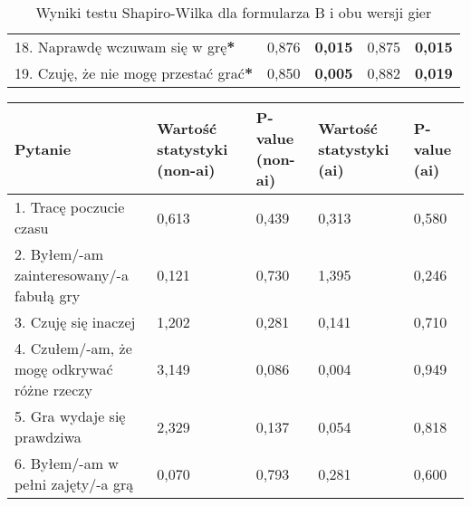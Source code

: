 \begin{table}[!h]
\begin{center}
\begin{tabular}{|m{10em}|m{5em}|m{5em}|m{5em}|m{5em}|}
            18. Naprawdę wczuwam się w grę\textbf{*}                                    & 0,876                             & \textbf{0,015}         & 0,875                         & \textbf{0,015}     \\
            19. Czuję, że nie mogę przestać grać\textbf{*}                              & 0,850                             & \textbf{0,005}         & 0,882                         & \textbf{0,019}     \\
            \hline
        \end{tabular}
    \end{center}
    \caption{Wyniki testu Shapiro-Wilka dla formularza B i obu wersji gier}\label{tab1:ch7_11}
\end{table}

\begin{table}[!h]
    \begin{center}
        \begin{tabular}{|m{10em}|m{5em}|m{5em}|m{5em}|m{5em}|}
            \hline
            Pytanie                                                           & Wartość statystyki (non-\gls{ai}) & P-value (non-\gls{ai}) & Wartość statystyki (\gls{ai}) & P-value (\gls{ai}) \\
            \hline
            1. Tracę poczucie czasu                                           & 0,613                             & 0,439                  & 0,313                         & 0,580              \\
            2. Byłem/-am \newline zainteresowany/-a fabułą gry                & 0,121                             & 0,730                  & 1,395                         & 0,246              \\
            3. Czuję się inaczej                                              & 1,202                             & 0,281                  & 0,141                         & 0,710              \\
            4. Czułem/-am, że mogę odkrywać różne rzeczy                      & 3,149                             & 0,086                  & 0,004                         & 0,949              \\
            5. Gra wydaje się prawdziwa                                       & 2,329                             & 0,137                  & 0,054                         & 0,818              \\
            6. Byłem/-am \newline w pełni zajęty/-a grą                       & 0,070                             & 0,793                  & 0,281                         & 0,600              \\

\end{tabular}
\end{center}
\end{table}
